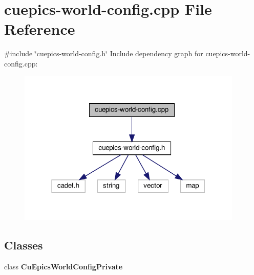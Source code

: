 \section{cuepics-\/world-\/config.cpp File Reference}
\label{cuepics-world-config_8cpp}
{\ttfamily \#include \char`\"{}cuepics-\/world-\/config.\+h\char`\"{}}\newline
Include dependency graph for cuepics-\/world-\/config.cpp\+:\nopagebreak
\begin{figure}[H]
\begin{center}
\leavevmode
\includegraphics[width=304pt]{cuepics-world-config_8cpp__incl}
\end{center}
\end{figure}
\subsection*{Classes}
\begin{DoxyCompactItemize}
\item 
class \textbf{ Cu\+Epics\+World\+Config\+Private}
\end{DoxyCompactItemize}
